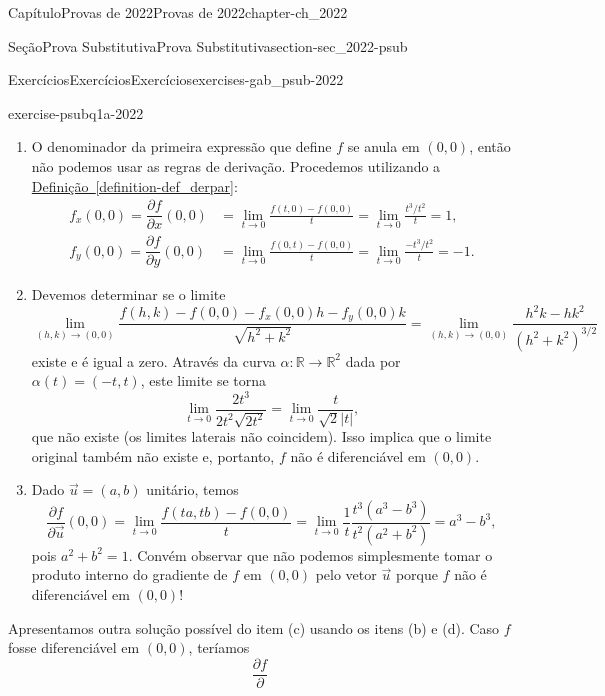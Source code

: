 \documentclass[oneside,10pt,]{book}
\newcommand{\xreffont}{\relax}
\numberwithin{equation}{section}
\newcommand{\R}{\mathbb R}
\begin{document}
\begin{chapterptx}{Capítulo}{Provas de 2022}{}{Provas de 2022}{}{}{chapter-ch_2022}
\begin{sectionptx}{Seção}{Prova Substitutiva}{}{Prova Substitutiva}{}{}{section-sec_2022-psub}
\begin{exercises-subsection-numberless}{Exercícios}{Exercícios}{}{Exercícios}{}{}{exercises-gab_psub-2022}
\begin{divisionexercise}{1}{}{}{exercise-psubq1a-2022}
\begin{enumerate}[label=\alph*.]
\begin{align*}
\underbrace{\frac{y^2}{x^2+y^2}}_{\text{limitado}}\right)\\
&=0=f(0,0),
\end{align*}
para concluir que \(f\) é contínua em \((0,0)\).%
\item{}O denominador da primeira expressão que define \(f\) se anula em \((0,0)\), então não podemos usar as regras de derivação. Procedemos utilizando a \hyperref[definition-def_derpar]{Definição~{\xreffont\ref{definition-def_derpar}}}:%
\begin{align*}
f_x(0,0)=\dfrac{\partial f}{\partial x}(0,0) &=
\lim_{t \to 0} \frac{f(t,0) -f(0,0)}{t} = \lim_{t \to 0}
\frac{{t^3}/{t^2}}{t} = 1,\\
f_y(0,0)=\dfrac{\partial f}{\partial y}(0,0) &=
\lim_{t \to 0} \frac{f(0,t) -f(0,0)}{t} = \lim_{t \to 0}
\frac{{-t^3}/{t^2}}{t} = -1.
\end{align*}
%
\item{}Devemos determinar se o limite%
\begin{equation*}
\lim_{(h,k)\to (0,0)}
\frac{f(h,k)-f(0,0) - f_x(0,0)h - f_y(0,0)k}{\sqrt{h^2+k^2}} =
\lim_{(h,k) \to (0,0)} \frac{h^2k -
hk^2}{(h^2+k^2)^{3/2}}
\end{equation*}
existe e é igual a zero. Através da curva \(\alpha\colon\R\to\R^2\) dada por \(\alpha(t) = (-t,t)\), este limite se torna%
\begin{equation*}
\lim_{t
\to 0} \frac{2t^3}{2t^2 \sqrt{2t^2}} = \lim_{t \to 0}
\frac{t}{\sqrt{2}|t|},
\end{equation*}
que não existe (os limites laterais não coincidem). Isso implica que o limite original também não existe e, portanto, \(f\) não é diferenciável em \((0,0)\).%
\item{}Dado \(\vec{u}=(a,b)\) unitário, temos%
\begin{equation*}
\dfrac{\partial
f}{\partial \vec{u}}(0,0) = \lim_{t \to 0} \frac{f(ta,tb)
-f(0,0)}{t} = \lim_{t \to 0}
\frac{1}{t}\frac{t^3(a^3-b^3)}{t^2(a^2+b^2)} = a^3 - b^3,
\end{equation*}
pois \(a^2+b^2 = 1\). Convém observar que não podemos simplesmente tomar o produto interno do gradiente de \(f\) em \((0,0)\) pelo vetor \(\vec{u}\) porque \(f\) não é diferenciável em \((0,0)\)!%
\end{enumerate}
%
\par
Apresentamos outra solução possível do item (c) usando os itens (b) e (d). Caso \(f\) fosse diferenciável em \((0,0)\), teríamos%
\begin{equation*}
\frac{\partial f}{\partial
}
\end{equation*}
\end{divisionexercise}
\end{exercises-subsection-numberless}
\end{sectionptx}
\end{chapterptx}
\end{document}
